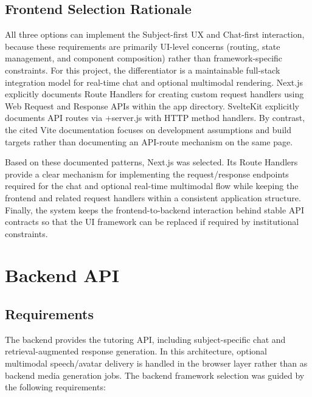\subsection{Frontend Selection Rationale}
All three options can implement the Subject-first UX and Chat-first interaction, because these requirements are primarily UI-level concerns (routing, state management, and component composition) rather than framework-specific constraints. For this project, the differentiator is a maintainable full-stack integration model for real-time chat and optional multimodal rendering. Next.js explicitly documents Route Handlers for creating custom request handlers using Web Request and Response APIs within the app directory. SvelteKit explicitly documents API routes via +server.js with HTTP method handlers. By contrast, the cited Vite documentation focuses on development assumptions and build targets rather than documenting an API-route mechanism on the same page.

Based on these documented patterns, Next.js was selected. Its Route Handlers provide a clear mechanism for implementing the request/response endpoints required for the chat and optional real-time multimodal flow while keeping the frontend and related request handlers within a consistent application structure. Finally, the system keeps the frontend-to-backend interaction behind stable API contracts so that the UI framework can be replaced if required by institutional constraints.

\section{Backend API}
\subsection{Requirements}
The backend provides the tutoring API, including subject-specific chat and retrieval-augmented response generation. In this architecture, optional multimodal speech/avatar delivery is handled in the browser layer rather than as backend media generation jobs. The backend framework selection was guided by the following requirements:


